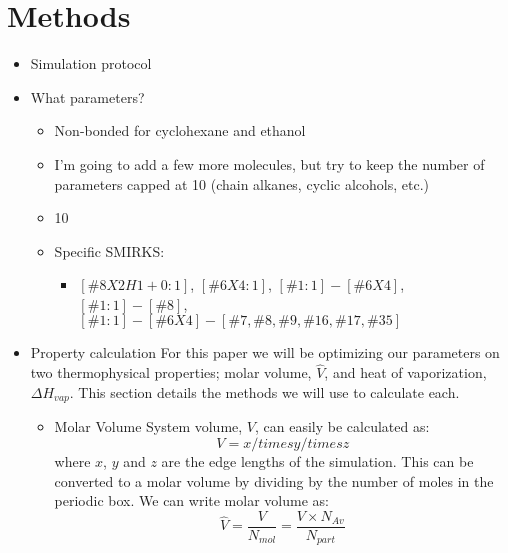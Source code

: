 \documentclass[aps,pre,nofootinbib,superscriptaddress,linenumbers,10pt, draft,tightenlines]{revtex4-1}
\begin{document}
\section{Methods}
\begin{itemize}
	\item Simulation protocol
	\item What parameters?
	\begin{itemize}
		\item Non-bonded for cyclohexane and ethanol 
		\item I'm going to add a few more molecules,
		      but try to keep the number of parameters capped at 10 (chain alkanes, cyclic alcohols, etc.)
		\item 10
		\item Specific SMIRKS:
		\begin{itemize}
			\item $[\#8X2H1+0:1]$, $[\#6X4:1]$, $[\#1:1]-[\#6X4]$, $[\#1:1]-[\#8]$, 
			      $[\#1:1]-[\#6X4]-[\#7,\#8,\#9,\#16,\#17,\#35]$
		\end{itemize}
	\end{itemize}
    \item Property calculation
    For this paper we will be optimizing our parameters on two thermophysical properties; molar volume, $\hat{V}$, and heat of 
    vaporization, $\Delta H_{vap}$. This section details the methods we will use to calculate each.
    \begin{itemize}
    	\item Molar Volume
    	System volume, $V$, can easily be calculated as:
    	\begin{equation} V = x /times y /times z \end{equation}
    	where $x$, $y$ and $z$ are the edge lengths of the simulation.
    	This can be converted to a molar volume by dividing by the number of moles in the periodic box. We can write molar
    	volume as:
    	\begin{equation} \hat{V} = \frac{V}{N_{mol}} = \frac{V \times N_{Av}}{N_{part}} \end{equation}

\end{itemize}
\end{itemize}
\end{document}
